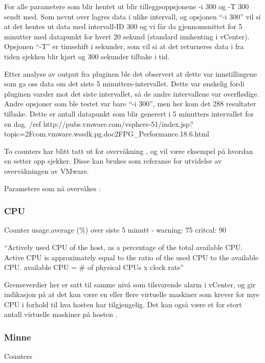 For alle parametere som blir hentet ut blir tilleggsoppsjonene -i 300 og -T 300 sendt med.
Som nevnt over lagres data i ulike intervall, og opsjonen “-i 300” vil si at det hentes ut data med intervall-ID 300 og vi får da gjennomsnittet for 5 minutter med datapunkt for hvert 20 sekund (standard innhenting i vCenter). Opsjonen “-T” er timsehift i sekunder, som vil si at det returneres data i fra tiden sjekken blir kjørt og 300 sekunder tilbake i tid. 

Etter analyse av output fra pluginen ble det observert at dette var innstillingene som ga oss data om det siste 5 minutters-intervallet. Dette var ønskelig fordi pluginen varsler mot det siste intervallet, så de andre intervallene var overflødige. Andre opsjoner som ble testet var bare “-i 300”, men her kom det 288 resultater tilbake. Dette er antall datapunkt som blir generert i 5 minutters intervallet for en dag. /ref http://pubs.vmware.com/vsphere-51/index.jsp?topic=2Fcom.vmware.wssdk.pg.doc2FPG\_Performance.18.6.html

To counters har blitt tatt ut for overvåkning , og vil være eksempel på hvordan en setter opp sjekker. Disse kan brukes som referanse for utvidelse av overvåkningen av VMware. 

Parametere som nå overvåkes \cite{ciscovirtual} \cite{vmwaremonitoring}:
 
\subsubsection*{CPU}

Counter usage.average (\%) over siste 5 minutt -  warning: 75 critcal: 90 

``Actively used CPU of the host, as a percentage of the total available CPU. Active CPU is approximately equal to the ratio of the used CPU to the available CPU. available CPU = \# of physical CPUs x clock rate''

Grenseverdier her er satt til samme nivå som tilsvarende alarm i vCenter, og gir indikasjon på at det kan være en eller flere virtuelle maskiner som krever for mye CPU i forhold til hva hosten har tilgjengelig. Det kan også være et for stort antall virtuelle maskiner på hosten \cite{vmwarecounters}. 

\subsubsection*{Minne}

Counters 

